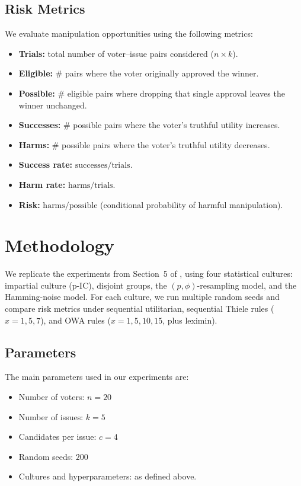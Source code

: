 \documentclass[11pt]{article}
\begin{document}
\subsection{Risk Metrics}
We evaluate manipulation opportunities using the following metrics:
\begin{itemize}
    \item \textbf{Trials:} total number of voter–issue pairs considered ($n \times k$).
    \item \textbf{Eligible:} \# pairs where the voter originally approved the winner.
    \item \textbf{Possible:} \# eligible pairs where dropping that single approval leaves the winner unchanged.
    \item \textbf{Successes:} \# possible pairs where the voter’s truthful utility increases.
    \item \textbf{Harms:} \# possible pairs where the voter’s truthful utility decreases.
    \item \textbf{Success rate:} $\text{successes} / \text{trials}$.
    \item \textbf{Harm rate:} $\text{harms} / \text{trials}$.
    \item \textbf{Risk:} $\text{harms} / \text{possible}$ (conditional probability of harmful manipulation).
\end{itemize}

\section{Methodology}
We replicate the experiments from Section~5 of \cite{lackner2023freeriding},
using four statistical cultures: impartial culture (p-IC), disjoint groups,
the $(p, \phi)$-resampling model, and the Hamming-noise model. For each culture,
we run multiple random seeds and compare risk metrics under sequential
utilitarian, sequential Thiele rules ($x=1,5,7$), and OWA rules ($x=1,5,10,15$, plus leximin).

\subsection{Parameters}
The main parameters used in our experiments are:

\begin{itemize}
    \item Number of voters: $n=20$
    \item Number of issues: $k=5$
    \item Candidates per issue: $c=4$
    \item Random seeds: $200$
    \item Cultures and hyperparameters: as defined above.
\end{itemize}
\end{document}
